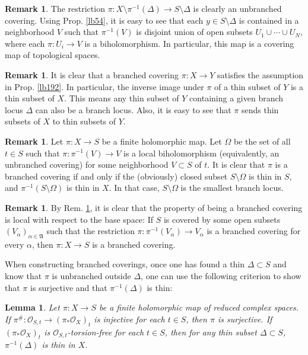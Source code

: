 \documentclass[12pt,b5paper,notitlepage]{report}
\theoremstyle{definition}
\newtheorem{rem}[df]{Remark}
\theoremstyle{plain}
\newtheorem{lm}[df]{Lemma}
\newcommand{\fk}{\mathfrak}
\newcommand{\scr}{\mathscr}
\numberwithin{equation}{section}
\begin{document}
\begin{rem}
The restriction $\pi:X\setminus\pi^{-1}(\Delta)\rightarrow S\setminus \Delta$ is clearly an unbranched covering. Using Prop. \ref{lb54}, it is easy to see that each $y\in S\setminus \Delta$ is contained in a neighborhood $V$ such that $\pi^{-1}(V)$ is disjoint union of open subsets $U_1\cup\cdots\cup U_N$, where each $\pi:U_i\rightarrow V$ is a biholomorphism. In particular, this map is a covering map of topological spaces.
\end{rem}


\begin{rem}\label{lb209}
It is clear that a branched covering $\pi:X\rightarrow Y$ satisfies the assumption in Prop. \ref{lb192}. In particular, the inverse image under $\pi$ of a thin subset of $Y$ is a thin subset of $X$. This means any thin subset of $Y$ containing a given branch locus $\Delta$ can also be a branch locus. Also, it is easy to see that $\pi$ sends thin subsets of $X$ to thin subsets of $Y$.   
\end{rem}


\begin{rem}\label{lb199}
Let $\pi:X\rightarrow S$ be a finite holomorphic map. Let $\Omega$ be the set of all $t\in S$ such that $\pi:\pi^{-1}(V)\rightarrow V$ is a local biholomorphism (equivalently, an unbranched covering) for some neighborhood $V\subset S$ of $t$. It is clear that $\pi$ is a branched covering if and only if the (obviously) closed subset $S\setminus\Omega$ is thin in $S$, and $\pi^{-1}(S\setminus\Omega)$ is thin in $X$. In that case, $S\setminus\Omega$ is the smallest branch locus.
\end{rem}


\begin{rem}\label{lb200}
By Rem. \ref{lb199}, it is clear that the property of being a branched covering is local with respect to the base space: If $S$ is covered by some open subsets $(V_\alpha)_{\alpha\in\fk A}$ such that the restriction $\pi:\pi^{-1}(V_\alpha)\rightarrow V_\alpha$ is a branched covering for every $\alpha$, then $\pi:X\rightarrow S$ is a branched covering.
\end{rem}

When constructing branched coverings, once one has found a thin $\Delta\subset S$ and know that $\pi$ is unbranched outside $\Delta$, one can use the following criterion to show that $\pi$ is surjective and that $\pi^{-1}(\Delta)$ is thin:


\begin{lm}\label{lb230}
Let $\pi:X\rightarrow S$ be a finite holomorphic map of reduced complex spaces. If $\pi^\#:\scr O_{S,t}\rightarrow(\pi_*\scr O_X)_t$ is injective for each $t\in S$, then $\pi$ is surjective. If $(\pi_*\scr O_X)_t$ is $\scr O_{S,t}$-torsion-free for each $t\in S$, then for any thin subset $\Delta\subset S$, $\pi^{-1}(\Delta)$ is thin in $X$.
\end{lm}
\end{document}
